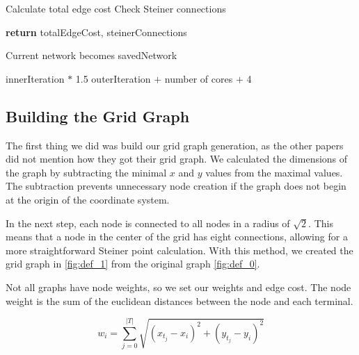\begin{algorithm}
\begin{algorithmic}
                \EndFor
        
                    \State Calculate total edge cost
                    \State Check Steiner connections
                \EndFor
        
                \State \textbf{return} totalEdgeCost, steinerConnections
                
            \EndFor
        
                \State Current network becomes savedNetwork
            \EndIf
        
                \State innerIteration $*$ 1.5
                \State outerIteration $+$ number of cores $+$ 4
            \EndIf
            
        \EndWhile    
    \end{algorithmic}
\end{algorithm}


\subsection{Building the Grid Graph}
\label{sec:grid_graph}
The first thing we did was build our grid graph generation, as the other papers did not mention how they got their grid graph. We calculated the dimensions of the graph by subtracting the minimal $x$ and $y$ values from the maximal values. The subtraction prevents unnecessary node creation if the graph does not begin at the origin of the coordinate system. 

In the next step, each node is connected to all nodes in a radius of $\sqrt{2}$. This means that a node in the center of the grid has eight connections, allowing for a more straightforward Steiner point calculation. With this method, we created the grid graph in \autoref{fig:def_1} from the original graph \autoref{fig:def_0}.

Not all graphs have node weights, so we set our weights and edge cost. The node weight is the sum of the euclidean distances between the node and each terminal. 

\begin{equation}
    \label{eqn:node_weights}
    w_i = \sum\limits_{j=0}^{|T|}  \sqrt{(x_{t_j} - x_i)^2 + (y_{t_j} - y_i)^2}
\end{equation}

